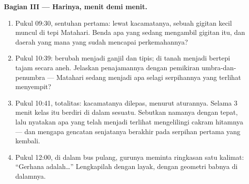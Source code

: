 \begin{problem}
\medskip\noindent\textbf{Bagian III --- Harinya, menit demi
menit.}
\begin{enumerate}[resume]
  \item Pukul 09:30, sentuhan pertama: lewat kacamatanya, sebuah
        gigitan kecil muncul di tepi Matahari. Benda apa yang sedang
        mengambil gigitan itu, dan daerah  yang mana
        yang sudah mencapai perkemahannya?
  \item Pukul 10:39:  berubah menjadi ganjil dan tipis;
         di tanah menjadi bertepi tajam secara aneh.
        Jelaskan penajamannya dengan pemikiran umbra-dan-penumbra ---
        Matahari sedang menjadi apa selagi serpihannya yang terlihat
        menyempit?
  \item Pukul 10:41, totalitas: kacamatanya dilepas, menurut
        aturannya. Selama $3$ menit kelas itu berdiri di dalam
        sesuatu. Sebutkan namanya dengan tepat, lalu nyatakan apa yang
        telah menjadi terlihat mengelilingi cakram hitamnya --- dan
        mengapa gencatan senjatanya berakhir pada serpihan pertama
        yang kembali.
  \item Pukul 12:00, di dalam bus pulang, gurunya meminta ringkasan
        satu kalimat: ``Gerhana adalah\dots'' Lengkapilah dengan
        layak, dengan geometri babnya di dalamnya.
\end{enumerate}
\end{problem}
